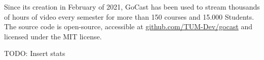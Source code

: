 Since its creation in February of 2021, GoCast has been used to stream thousands of hours of video every semester for more than 150 courses and 15.000 Students. The source code is open-source, accessible at \href{https://github.com/TUM-Dev/gocast}{github.com/TUM-Dev/gocast} and licensed under the MIT license.

TODO: Insert stats


